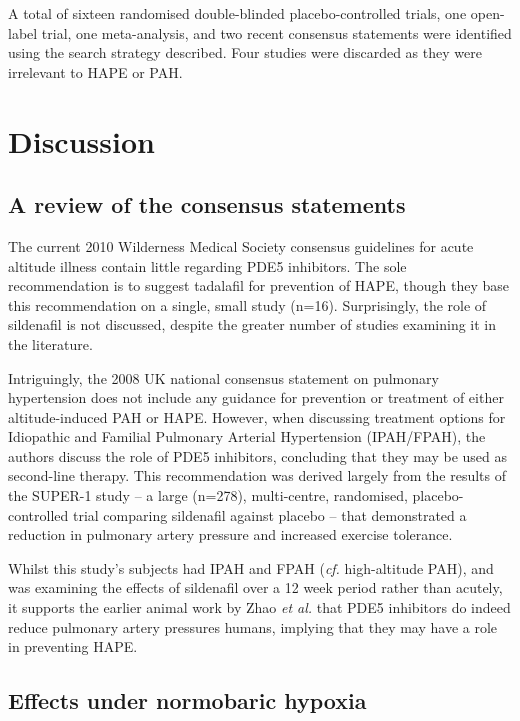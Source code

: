 \documentclass[10pt,a4paper]{article}
\begin{document}
A total of sixteen randomised double-blinded placebo-controlled trials, one open-label trial, one meta-analysis, and two recent consensus statements were identified using the search strategy described. Four studies were discarded as they were irrelevant to HAPE or PAH.

\section*{Discussion}

\subsection*{A review of the consensus statements}

The current 2010 Wilderness Medical Society consensus guidelines for acute altitude illness contain little regarding PDE5 inhibitors.\cite{Luks:2010ht} The sole recommendation is to suggest tadalafil for prevention of HAPE, though they base this recommendation on a single, small study (n=16).\cite{Maggiorini:2006kz} Surprisingly, the role of sildenafil is not discussed, despite the greater number of studies examining it in the literature.

Intriguingly, the 2008 UK national consensus statement on pulmonary hypertension does not include any guidance for prevention or treatment of either altitude-induced PAH or HAPE.\cite{NationalPulmonaryHypertensionCentresoftheUKandIreland:2008jh} However, when discussing treatment options for Idiopathic and Familial Pulmonary Arterial Hypertension (IPAH/FPAH), the authors discuss the role of PDE5 inhibitors, concluding that they may be used as second-line therapy. This recommendation was derived largely from the results of the SUPER-1 study -- a large (n=278), multi-centre, randomised, placebo-controlled trial comparing sildenafil against placebo -- that demonstrated a reduction in pulmonary artery pressure and increased exercise tolerance.\cite{Galie:2005gx}

Whilst this study's subjects had IPAH and FPAH (\emph{cf.} high-altitude PAH), and was examining the effects of sildenafil over a 12 week period rather than acutely, it supports the earlier animal work by Zhao \emph{et al.}\cite{Zhao:2001kj} that PDE5 inhibitors do indeed reduce pulmonary artery pressures humans, implying that they may have a role in preventing HAPE.

\subsection*{Effects under normobaric hypoxia}
\end{document}
